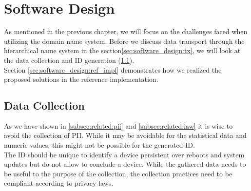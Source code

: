 \chapter{Software Design}
\label{chap:software_design}

As mentioned in the previous chapter, we will focus on the challenges faced when utilizing the domain name system. Before we discuss data transport through the hierarchical name system in the section\ref{sec:software_design:tx}, we will look at the data collection and ID generation (\ref{sec:software_design:data_collection}).\\
Section \ref{sec:software_design:ref_impl} demonstrates how we realized the proposed solutions in the reference implementation.


%



\section{Data Collection}
\label{sec:software_design:data_collection}
    As we have shown in \ref{subsec:related:pii} and \ref{subsec:related:law} it is wise to avoid the collection of PII. While it may be avoidable for the statistical data and numeric values, this might not be possible for the generated ID.\\
    The ID should be unique to identify a device persistent over reboots and system updates but do not allow to conclude a device.
    While the gathered data needs to be useful to the purpose of the collection, the collection practices need to be compliant according to privacy laws. 
    
